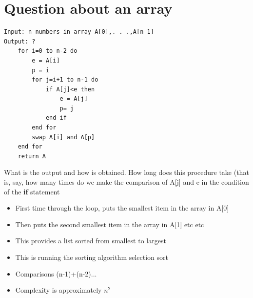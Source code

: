\documentclass{article}[18pt]
\begin{document}
\section{Question about an array}
\begin{lstlisting}[mathescape=true]
Input: n numbers in array A[0],. . .,A[n-1]
Output: ?
	for i=0 to n-2 do
		e = A[i]
		p = i
		for j=i+1 to n-1 do
			if A[j]<e then
				e = A[j]
				p= j
			end if
		end for
		swap A[i] and A[p]
	end for
	return A
\end{lstlisting}
What is the output and how is obtained. How long does this procedure take (that is, say, how many times do we make the comparison of A[j] and e in the condition of the \textbf{if} statement\\
\begin{itemize}
\item First time through the loop, puts the smallest item in the array in A[0]
\item Then puts the second smallest item in the array in A[1] etc etc
\item This provides a list sorted from smallest to largest
\item This is running the sorting algorithm selection sort
\item Comparisons (n-1)+(n-2)...
\item Complexity is approximately $n^2$
\end{itemize}
\end{document}
